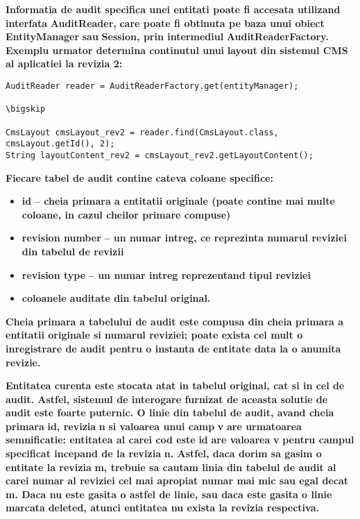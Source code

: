 \documentclass{article}
\begin{document}
\bigskip


\bigskip

\textbf{Informatia de audit specifica unei entitati poate fi accesata utilizand interfata }\textbf{AuditReader,}\textbf{ care poate fi obtinuta pe baza unui obiect }\textbf{EntityManager}\textbf{ sau }\textbf{Session}\textbf{, prin intermediul }\textbf{AuditReaderFactory.}\textbf{ Exemplu urmator determina continutul unui }\textbf{layout}\textbf{ din sistemul CMS al aplicatiei la revizia 2: }


\bigskip

\begin{verbatim}
AuditReader reader = AuditReaderFactory.get(entityManager);

\bigskip

CmsLayout cmsLayout_rev2 = reader.find(CmsLayout.class, cmsLayout.getId(), 2);
String layoutContent_rev2 = cmsLayout_rev2.getLayoutContent();
\end{verbatim}

\bigskip


\bigskip

\textbf{Fiecare tabel de audit contine cateva coloane specifice:}

\begin{itemize}
\item \textbf{id}\textbf{ -- cheia primara a entitatii originale (poate contine mai multe coloane, in cazul cheilor primare compuse)}
\item \textbf{revision number}\textbf{ -- un numar intreg, ce reprezinta numarul reviziei din tabelul de revizii}
\item \textbf{revision type}\textbf{ -- un numar intreg reprezentand tipul reviziei}
\item \textbf{coloanele auditate din tabelul original.}
\end{itemize}

\bigskip

\textbf{Cheia primara a tabelului de audit este compusa din cheia primara a entitatii originale si numarul reviziei; poate exista cel mult o inregistrare de audit pentru o instanta de entitate data la o anumita revizie.}

\textbf{Entitatea curenta este stocata atat in tabelul original, cat si in cel de audit. Astfel, sistemul de interogare furnizat de aceasta solutie de audit este foarte puternic. O linie din tabelul de audit, avand cheia primara }\textbf{id}\textbf{, revizia }\textbf{n}\textbf{ si valoarea unui camp }\textbf{v}\textbf{ are urmatoarea semnificatie: entitatea al carei cod este }\textbf{id}\textbf{ are valoarea }\textbf{v}\textbf{ pentru campul specificat incepand de la revizia }\textbf{n}\textbf{. Astfel, daca dorim sa gasim o entitate la revizia }\textbf{m}\textbf{, trebuie sa cautam linia din tabelul de audit al carei numar al reviziei cel mai apropiat numar mai mic sau egal decat }\textbf{m}\textbf{. Daca nu este gasita o astfel de linie, sau daca este gasita o linie marcata }\textbf{deleted}\textbf{, atunci entitatea nu exista la revizia respectiva.}
\end{document}
